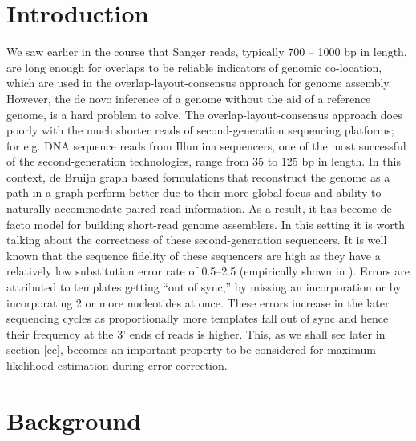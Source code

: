 \documentclass[11pt]{article}
\begin{document}
\section{Introduction}
We saw earlier in the course that Sanger reads, typically 700 -- 1000 bp in length, are long enough for overlaps to be reliable indicators of genomic co-location, which are used in the overlap-layout-consensus approach for genome assembly. However, the de novo inference of a genome without the aid of a reference genome, is a hard problem to solve. The overlap-layout-consensus approach does poorly with the much shorter reads of second-generation sequencing platforms; for e.g. DNA sequence reads from Illumina sequencers, one of the most successful of the second-generation technologies, range from 35 to 125 bp in length. In this context, de Bruijn graph \cite{debruijn} based formulations that reconstruct the genome as a path in a graph perform better due to their more global focus and ability to naturally accommodate paired read information. As a result, it has become de facto model for building short-read genome assemblers. In this setting it is worth talking about the correctness of these second-generation sequencers. It is well known that the sequence fidelity of these sequencers are high as they have a relatively low substitution error rate of 0.5--2.5 (empirically shown in \cite{quake}). Errors are attributed to templates getting “out of sync,” by missing an incorporation or by incorporating 2 or more nucleotides at once. These errors increase in the later sequencing cycles as proportionally more templates fall out of sync and hence their frequency at the 3' ends of reads is higher. This, as we shall see later in section \ref{ec}, becomes an important property to be considered for maximum likelihood estimation during error correction.\\

\section{Background}
\end{document}
